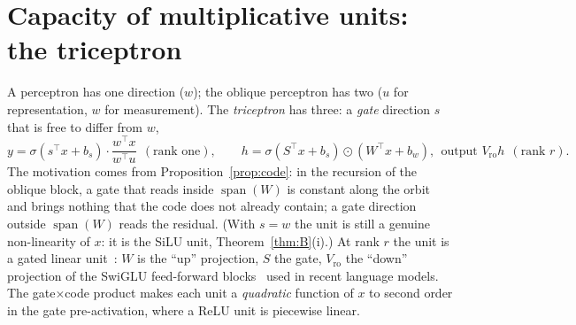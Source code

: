 \documentclass[11pt,a4paper]{article}
\theoremstyle{plain}
\theoremstyle{definition}
\theoremstyle{remark}
\newcommand{\spn}{\operatorname{span}}
\newcommand{\T}{\top}
\begin{document}
\section{Capacity of multiplicative units: the triceptron}
\label{sec:tri}
A perceptron has one direction ($w$); the oblique perceptron has two ($u$ for
representation, $w$ for measurement). The \emph{triceptron} has three: a
\emph{gate} direction $s$ that is free to differ from $w$,
\begin{equation}
  y=\sigma(s^\T x+b_s)\cdot\frac{w^\T x}{w^\T u}\ \ (\text{rank one}),\qquad
  h=\sigma(S^\T x+b_s)\odot(W^\T x+b_w),\ \ \text{output }V_{\mathrm{ro}}h\ \ (\text{rank }r).
  \label{eq:tri}
\end{equation}
The motivation comes from Proposition~\ref{prop:code}: in the recursion of
the oblique block, a gate that reads inside $\spn(W)$ is constant along the
orbit and brings nothing that the code does not already contain; a gate
direction outside $\spn(W)$ reads the residual. (With $s=w$ the unit is
still a genuine non-linearity of $x$: it is the SiLU unit,
Theorem~\ref{thm:B}(i).) At rank $r$ the unit is a gated linear
unit~\cite{dauphin2017glu}: $W$ is the ``up'' projection, $S$ the gate,
$V_{\mathrm{ro}}$ the ``down'' projection of the SwiGLU feed-forward blocks~\cite{shazeer2020glu}
used in recent language models. The gate$\times$code product makes each unit
a \emph{quadratic} function of $x$ to second order in the gate
pre-activation, where a ReLU unit is piecewise linear.
\end{document}
